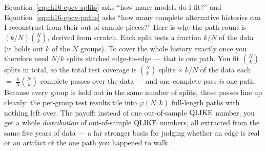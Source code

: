 \begin{intuition}
Equation~\eqref{eq:ch16-cpcv-splits} asks ``how many models do I fit?'' and Equation~\eqref{eq:ch16-cpcv-paths} asks ``how many complete alternative histories can I reconstruct from their out-of-sample pieces?''
Here is why the path count is $(k/N)\binom{N}{k}$, derived from scratch.
Each split tests a fraction $k/N$ of the data (it holds out $k$ of the $N$ groups).
To cover the whole history exactly once you therefore need $N/k$ splits stitched edge-to-edge --- that is one path.
You fit $\binom{N}{k}$ splits in total, so the total test coverage is $\binom{N}{k}$ splits $\times\ k/N$ of the data each $=\ \frac{k}{N}\binom{N}{k}$ complete passes over the data --- and one complete pass \emph{is} one path.
Because every group is held out in the same number of splits, those passes line up cleanly: the per-group test results tile into $\varphi(N,k)$ full-length paths with nothing left over.
The payoff: instead of one out-of-sample $\operatorname{QLIKE}$ number, you get a whole \emph{distribution} of out-of-sample $\operatorname{QLIKE}$ numbers, all extracted from the same five years of data --- a far stronger basis for judging whether an edge is real or an artifact of the one path you happened to walk.
\end{intuition}

